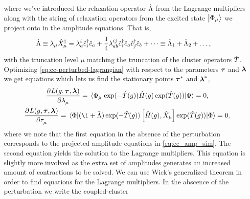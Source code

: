             where we've introduced the relaxation operator $\hat{\Lambda}$ from the
            Lagrange multipliers along with the string of relaxation operators
            from the excited state $\ket{\Phi_{\mu}}$ we project onto in the
            amplitude equations.
            That is,
            \begin{align}
                \hat{\Lambda}
                &\equiv
                \lambda_{\mu}\hat{X}^{\dagger}_{\mu}
                = \lambda^{i}_{a}\hat{c}_{i}^{\dagger}\hat{c}_{a}
                + \frac{1}{4}\lambda^{ij}_{ab}\hat{c}_{i}^{\dagger}\hat{c}_{a}\hat{c}_{j}^{\dagger}\hat{c}_{b}
                + \dots
                \equiv
                \hat{\Lambda}_1 + \hat{\Lambda}_2 + \dots,
            \end{align}
            with the truncation level $\mu$ matching the truncation of the
            cluster operators $\hat{T}$.
            Optimizing \autoref{eq:cc-perturbed-lagrangian} with respect to the
            parameters $\boldsymbol{\tau}$ and $\boldsymbol{\lambda}$ we get equations
            which lets us find the stationary points $\boldsymbol{\tau}^{*}$ and
            $\boldsymbol{\lambda}^{*}$,
            \begin{gather}
                \dpd[]{L(g, \vfg{\clustamp}, \vfg{\clustlamp})}
                {\clustlamp_{\mu}}
                = \mel*{\slat_{\mu}}{
                    \exponential(-\clust(g))
                    \hamil(g)
                    \exponential(\clust(g))
                }{\slat}
                = 0,
                \\
                \dpd[]{L(g, \vfg{\clustamp}, \vfg{\clustlamp})}
                {\clustamp_{\mu}}
                = \mel*{\slat}{
                    (\1 + \clustl)
                    \exponential(-\clust(g))
                    \com{\hamil(g)}{\hat{X}_{\mu}}
                    \exponential(\clust(g))
                }{\slat}
                = 0,
            \end{gather}
            where we note that the first equation in the absence of the
            perturbation corresponds to the projected amplitude equations in
            \autoref{eq:cc_amp_sim}.
            The second equation yields the solution to the Lagrange multipliers.
            This equation is slightly more involved as the extra set of
            amplitudes generates an increased amount of contractions to be
            solved.
            We can use Wick's generalized theorem in order to find equations for
            the Lagrange multipliers.
            In the abscence of the perturbation we write the coupled-cluster
